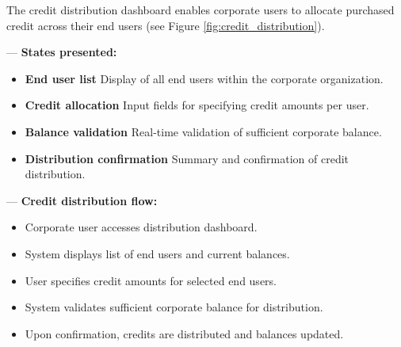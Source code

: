 The credit distribution dashboard enables corporate users to allocate purchased credit across their end users (see Figure \ref{fig:credit_distribution}).


— \textbf{States presented:}
\begin{itemize}[nosep,leftmargin=*,label=•]
  \item \textbf{End user list}  
    Display of all end users within the corporate organization.
  \item \textbf{Credit allocation}  
    Input fields for specifying credit amounts per user.
  \item \textbf{Balance validation}  
    Real-time validation of sufficient corporate balance.
  \item \textbf{Distribution confirmation}  
    Summary and confirmation of credit distribution.
\end{itemize}

— \textbf{Credit distribution flow:}
\begin{itemize}[nosep,leftmargin=*,label=•]
  \item Corporate user accesses distribution dashboard.
  \item System displays list of end users and current balances.
  \item User specifies credit amounts for selected end users.
  \item System validates sufficient corporate balance for distribution.
  \item Upon confirmation, credits are distributed and balances updated.
\end{itemize}
